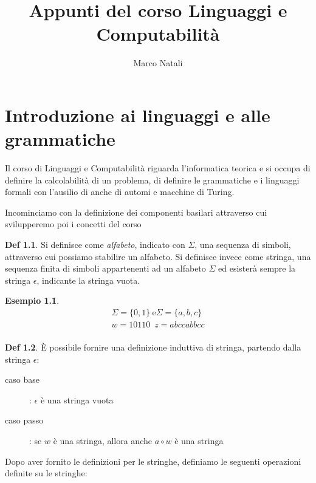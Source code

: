 \documentclass[a4paper]{book}
\theoremstyle{definition}%
\newtheorem*{defi}{Def}%
\newtheorem*{esempio}{Esempio}
\begin{document}
\title{Appunti del corso Linguaggi e Computabilità}
\author{Marco Natali}
\date{}
\maketitle

\chapter{Introduzione ai linguaggi e alle grammatiche}
Il corso di Linguaggi e Computabilità riguarda l'informatica teorica e si occupa di definire la calcolabilità di un problema,
di definire le grammatiche e i linguaggi formali con l'ausilio di anche di automi e macchine di Turing.

Incominciamo con la definizione dei componenti basilari attraverso cui svilupperemo poi i concetti del corso
\begin{defi}
  Si definisce come \emph{alfabeto}, indicato con $\Sigma$, una sequenza di simboli, attraverso cui possiamo stabilire un alfabeto.\newline
  Si definisce invece come stringa, una sequenza finita di simboli appartenenti ad un alfabeto $\Sigma$ ed esisterà sempre la stringa $\epsilon$,
  indicante la stringa vuota.
\end{defi}
\begin{esempio}
  \[
  \begin{aligned}
    \Sigma = \{0, 1\}\ \text{e} \Sigma = \{a, b, c\} \\
    w = 10110 \, \, \, z = abccabbcc \\
  \end{aligned}
  \]
\end{esempio}
\begin{defi}
È possibile fornire una definizione induttiva di stringa, partendo dalla stringa $\epsilon$:
    \begin{description}
      \item [caso base]: $\epsilon$ è una stringa vuota
      \item [caso passo]: se $w$ è una stringa, allora anche $a \circ w $ è una stringa
    \end{description}
\end{defi}
Dopo aver fornito le definizioni per le stringhe, definiamo le seguenti operazioni definite su le stringhe:
\end{document}
